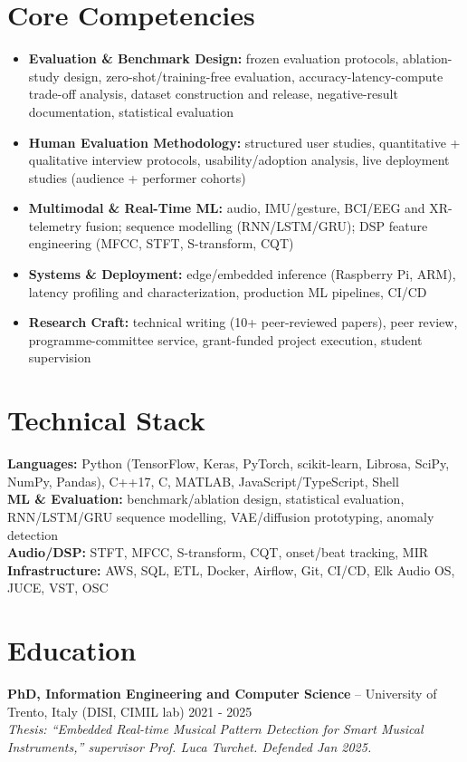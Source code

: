 \documentclass[11pt]{article}
\begin{document}
\section*{Core Competencies}
\begin{itemize}[leftmargin=1.5em, itemsep=-0.2em]
    \item \textbf{Evaluation \& Benchmark Design:} frozen evaluation protocols, ablation-study design, zero-shot/training-free evaluation, accuracy-latency-compute trade-off analysis, dataset construction and release, negative-result documentation, statistical evaluation
    \item \textbf{Human Evaluation Methodology:} structured user studies, quantitative + qualitative interview protocols, usability/adoption analysis, live deployment studies (audience + performer cohorts)
    \item \textbf{Multimodal \& Real-Time ML:} audio, IMU/gesture, BCI/EEG and XR-telemetry fusion; sequence modelling (RNN/LSTM/GRU); DSP feature engineering (MFCC, STFT, S-transform, CQT)
    \item \textbf{Systems \& Deployment:} edge/embedded inference (Raspberry Pi, ARM), latency profiling and characterization, production ML pipelines, CI/CD
    \item \textbf{Research Craft:} technical writing (10+ peer-reviewed papers), peer review, programme-committee service, grant-funded project execution, student supervision
\end{itemize}

\section*{Technical Stack}
\textbf{Languages:} Python (TensorFlow, Keras, PyTorch, scikit-learn, Librosa, SciPy, NumPy, Pandas), C++17, C, MATLAB, JavaScript/TypeScript, Shell \\
\textbf{ML \& Evaluation:} benchmark/ablation design, statistical evaluation, RNN/LSTM/GRU sequence modelling, VAE/diffusion prototyping, anomaly detection \\
\textbf{Audio/DSP:} STFT, MFCC, S-transform, CQT, onset/beat tracking, MIR \\
\textbf{Infrastructure:} AWS, SQL, ETL, Docker, Airflow, Git, CI/CD, Elk Audio OS, JUCE, VST, OSC

\section*{Education}
\textbf{PhD, Information Engineering and Computer Science} -- University of Trento, Italy (DISI, CIMIL lab) \hfill 2021 - 2025 \\
\textit{Thesis: ``Embedded Real-time Musical Pattern Detection for Smart Musical Instruments,'' supervisor Prof. Luca Turchet. Defended Jan 2025.}
\end{document}
